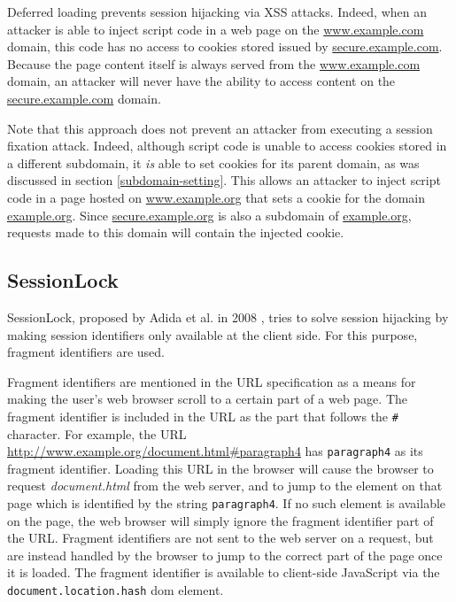 Deferred loading prevents session hijacking via XSS attacks. Indeed, when an attacker is able to inject script code in a web page on the \url{www.example.com} domain, this code has no access to cookies stored issued by \url{secure.example.com}. Because the page content itself is always served from the \url{www.example.com} domain, an attacker will never have the ability to access content on the \url{secure.example.com} domain.

Note that this approach does not prevent an attacker from executing a session fixation attack. Indeed, although script code is unable to access cookies stored in a different subdomain, it \emph{is} able to set cookies for its parent domain, as was discussed in section \ref{subdomain-setting}. This allows an attacker to inject script code in a page hosted on \url{www.example.org} that sets a cookie for the domain \url{example.org}. Since \url{secure.example.org} is also a subdomain of \url{example.org}, requests made to this domain will contain the injected cookie.

\subsection{SessionLock}

SessionLock, proposed by Adida et al. in 2008 \cite{Adida2008}, tries to solve session hijacking by making session identifiers only available at the client side. For this purpose, fragment identifiers are used.

Fragment identifiers are mentioned in the URL specification \cite{rfc3986} as a means for making the user's web browser scroll to a certain part of a web page. The fragment identifier is included in the URL as the part that follows the \texttt{\#} character. For example, the URL \url{http://www.example.org/document.html#paragraph4} has \texttt{paragraph4} as its fragment identifier. Loading this URL in the browser will cause the browser to request \emph{document.html} from the web server, and to jump to the element on that page which is identified by the string \texttt{paragraph4}. If no such element is available on the page, the web browser will simply ignore the fragment identifier part of the URL. Fragment identifiers are not sent to the web server on a request, but are instead handled by the browser to jump to the correct part of the page once it is loaded. The fragment identifier is available to client-side JavaScript via the \texttt{document.location.hash} \gls{dom} element.


